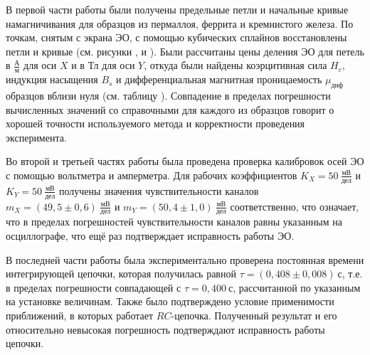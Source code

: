 \documentclass[a4paper, 12pt]{article}
\begin{document}
В первой части работы были получены предельные петли и начальные кривые намагничивания для образцов из пермаллоя, феррита и кремнистого железа. По точкам, снятым с экрана ЭО, с помощью кубических сплайнов восстановлены петли и кривые (см. рисунки ,  и ). Были рассчитаны цены деления ЭО для петель в $\frac{\text{А}}{\text{м}}$ для оси $X$ и в $\text{Тл}$ для оси $Y$, откуда были найдены коэрцитивная сила $H_c$, индукция насыщения $B_s$ и дифференциальная магнитная проницаемость $\mu_{\text{диф}}$ образцов вблизи нуля (см. таблицу ). Совпадение в пределах погрешности вычисленных значений со справочными  для каждого из образцов говорит о хорошей точности используемого метода и корректности проведения эксперимента.

Во второй и третьей частях работы была проведена проверка калибровок осей ЭО с помощью вольтметра и амперметра. Для рабочих коэффициентов $K_X=50~\frac{\text{мВ}}{\text{дел}}$ и $K_Y=50~\frac{\text{мВ}}{\text{дел}}$ получены значения чувствительности каналов $m_X=\left(49,5\pm0,6\right)~\frac{\text{мВ}}{\text{дел}}$ и $m_Y=\left(50,4\pm1,0\right)~\frac{\text{мВ}}{\text{дел}}$ соответственно, что означает, что в пределах погрешностей чувствительности каналов равны указанным на осциллографе, что ещё раз подтверждает исправность работы ЭО.

В последней части работы  была экспериментально проверена постоянная времени интегрирующей цепочки, которая получилась равной
$\tau=\left(0,408\pm0,008\right)~\text{с}$, т.е. в пределах погрешности совпадающей с $\tau=0,400~\text{с}$, рассчитанной по указанным на установке величинам. Также было подтверждено условие применимости приближений, в которых работает $RC$-цепочка. Полученный результат и его относительно невысокая погрешность подтверждают исправность работы цепочки.
\end{document}
